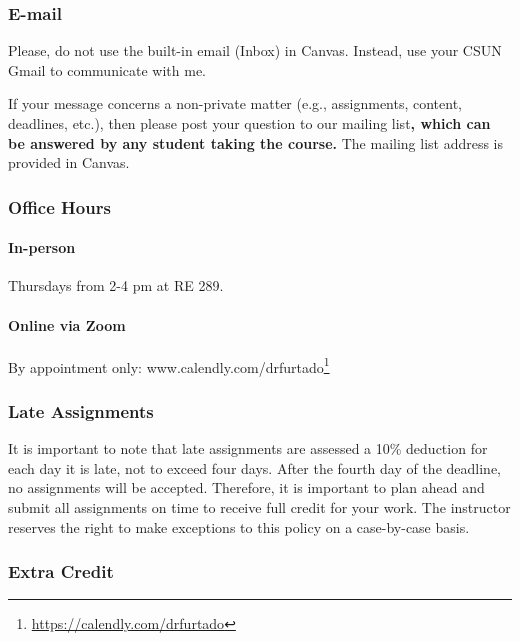 \documentclass[
  letterpaper,
  DIV=11,
  numbers=noendperiod]{scrartcl}
\let\oldparagraph\paragraph
\renewcommand{\paragraph}[1]{\oldparagraph{#1}\mbox{}}
\DeclareRobustCommand{\href}[2]{#2\footnote{\url{#1}}}
\begin{document}
\hypertarget{sec-e-mail}{%
\subsubsection{E-mail}\label{sec-e-mail}}

Please, do not use the built-in email (Inbox) in Canvas. Instead, use
your CSUN Gmail to communicate with me.

If your message concerns a non-private matter (e.g., assignments,
content, deadlines, etc.), then please post your question to our mailing
list\textbf{, which can be answered by any student taking the course.}
The mailing list address is provided in Canvas.

\hypertarget{sec-office-hours}{%
\subsubsection{Office Hours}\label{sec-office-hours}}

\hypertarget{in-person}{%
\paragraph{In-person}\label{in-person}}

Thursdays from 2-4 pm at RE 289.

\hypertarget{online-via-zoom}{%
\paragraph{Online via Zoom}\label{online-via-zoom}}

By appointment only:
\href{https://calendly.com/drfurtado}{www.calendly.com/drfurtado}

\hypertarget{sec-late-assignments}{%
\subsubsection{Late Assignments}\label{sec-late-assignments}}

It is important to note that late assignments are assessed a 10\%
deduction for each day it is late, not to exceed four days. After the
fourth day of the deadline, no assignments will be accepted. Therefore,
it is important to plan ahead and submit all assignments on time to
receive full credit for your work. The instructor reserves the right to
make exceptions to this policy on a case-by-case basis.

\hypertarget{extra-credit}{%
\subsubsection{Extra Credit}\label{extra-credit}}
\end{document}
